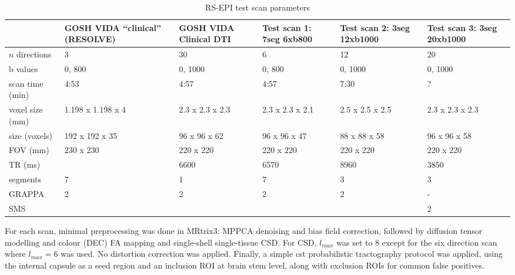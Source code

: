 
\begin{table}
  \caption{RS-EPI test scan parameters}
  \label{tab:rsepi}
  \small
  \begin{tabularx}{\textwidth}{l X X X X X} \toprule
    & GOSH VIDA “clinical” (RESOLVE) & GOSH VIDA Clinical DTI & Test scan 1: 7seg 6xb800 & Test scan 2: 3seg 12xb1000 & Test scan 3: 3seg 20xb1000 \\
  \midrule
   $n$ directions & 3 & 30 & 6 & 12 & 20 \\
   b values & 0, 800 & 0, 1000 & 0, 800 & 0, 1000 & 0, 1000 \\
   scan time (min) & 4:53 & 4:57 & 4:57 & 7:30 & ? \\
   voxel size (mm) & 1.198 x 1.198 x 4 & 2.3 x 2.3 x 2.3 & 2.3 x 2.3 x 2.1 & 2.5 x 2.5 x 2.5 & 2.3 x 2.3 x 2.3 \\
   size (voxels) & 192 x 192 x 35  & 96 x 96 x 62 & 96 x 96 x 47 & 88 x 88 x 58 & 96 x 96 x 58 \\
   FOV (mm)  & 230 x 230  & 220 x 220 & 220 x 220 & 220 x 220 & 220 x 220 \\
   TR (ms) &  & 6600 & 6570 & 8960 & 3850 \\
   segments & 7 & 1 & 7 & 3 & 3 \\
   GRAPPA & 2 & 2 & 2 & 2 & - \\
   SMS &  &  &  &  & 2 \\ \bottomrule
  \end{tabularx}
\end{table}

For each scan, minimal preprocessing was done in MRtrix3:\autocite{Tournier2019} MPPCA denoising and bias field correction, followed by diffusion tensor modelling and colour (DEC) FA mapping and single-shell single-tissue CSD.
For CSD, $l_{max}$ was set to 8 except for the six direction scan where $l_{max}=6$ was used.
No distortion correction was applied.
Finally, a simple \gls{cst} probabilistic tractography protocol was applied, using the internal capsule as a seed region and an inclusion ROI at brain stem level, along with exclusion ROIs for common false positives.

